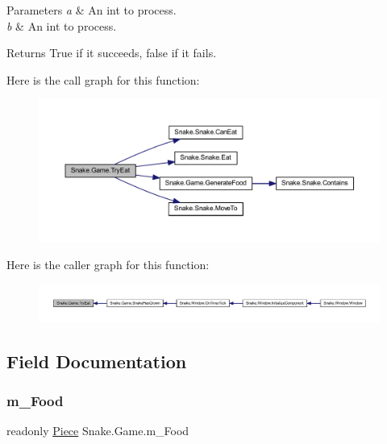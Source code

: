 \begin{DoxyParams}{Parameters}
{\em a} & An int to process. \\
\hline
{\em b} & An int to process. \\
\hline
\end{DoxyParams}


\begin{DoxyReturn}{Returns}
True if it succeeds, false if it fails. 
\end{DoxyReturn}
Here is the call graph for this function\+:
\nopagebreak
\begin{figure}[H]
\begin{center}
\leavevmode
\includegraphics[width=350pt]{d5/d72/class_snake_1_1_game_a5efcd7d64d49bc7f068f2eaae008d085_cgraph}
\end{center}
\end{figure}
Here is the caller graph for this function\+:
\nopagebreak
\begin{figure}[H]
\begin{center}
\leavevmode
\includegraphics[width=350pt]{d5/d72/class_snake_1_1_game_a5efcd7d64d49bc7f068f2eaae008d085_icgraph}
\end{center}
\end{figure}


\subsection{Field Documentation}
\mbox{\label{class_snake_1_1_game_a12e14cdbb5ccab077cb96099b98eed79}} 
\subsubsection{\texorpdfstring{m\+\_\+\+Food}{m\_Food}}
{\footnotesize\ttfamily readonly \mbox{\hyperlink{class_snake_1_1_piece}{Piece}} Snake.\+Game.\+m\+\_\+\+Food\hspace{0.3cm}{\ttfamily [private]}}



